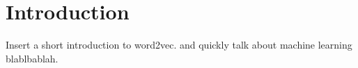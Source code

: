 \chapter{Introduction}\label{chap:introduction}

Insert a short introduction to word2vec. and quickly talk about machine learning blablbablah. 

